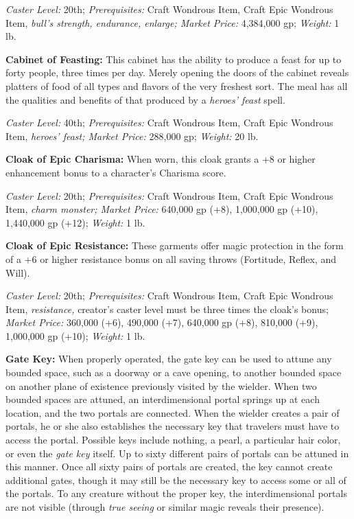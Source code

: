 \documentclass{article}
\begin{document}
\textit{Caster Level: }20th; \textit{Prerequisites: }Craft Wondrous Item, Craft 
Epic Wondrous Item, \textit{bull's strength, endurance, enlarge; Market Price: 
}4,384,000 gp; \textit{Weight: }1 lb. 

\textbf{Cabinet of Feasting: }This cabinet has the ability to produce a feast for 
up to forty people, three times per day. Merely opening the doors of the cabinet 
reveals platters of food of all types and flavors of the very freshest sort. The 
meal has all the qualities and benefits of that produced by a \textit{heroes' feast 
}spell. 

\textit{Caster Level: }40th; \textit{Prerequisites: }Craft Wondrous Item, Craft 
Epic Wondrous Item, \textit{heroes' feast; Market Price: }288,000 gp; \textit{Weight: 
}20 lb. 

\textbf{Cloak of Epic Charisma: }When worn, this cloak grants a +8 or higher enhancement 
bonus to a character's Charisma score. 

\textit{Caster Level: }20th; \textit{Prerequisites: }Craft Wondrous Item, Craft 
Epic Wondrous Item, \textit{charm monster; Market Price: }640,000 gp (+8), 1,000,000 
gp (+10), 1,440,000 gp (+12); \textit{Weight: }1 lb. 

\textbf{Cloak of Epic Resistance: }These garments offer magic protection in the 
form of a +6 or higher resistance bonus on all saving throws (Fortitude, Reflex, 
and Will). 

\textit{Caster Level: }20th; \textit{Prerequisites: }Craft Wondrous Item, Craft 
Epic Wondrous Item, \textit{resistance, }creator's caster level must be three times 
the cloak's bonus; \textit{Market Price: }360,000 (+6), 490,000 (+7), 640,000 gp 
(+8), 810,000 (+9), 1,000,000 gp (+10); \textit{Weight: }1 lb. 

\textbf{Gate Key: }When properly operated, the gate key can be used to attune any 
bounded space, such as a doorway or a cave opening, to another bounded space on 
another plane of existence previously visited by the wielder. When two bounded 
spaces are attuned, an interdimensional portal springs up at each location, and 
the two portals are connected. When the wielder creates a pair of portals, he or 
she also establishes the necessary key that travelers must have to access the portal. 
Possible keys include nothing, a pearl, a particular hair color, or even the \textit{gate 
key }itself. Up to sixty different pairs of portals can be attuned in this manner. 
Once all sixty pairs of portals are created, the key cannot create additional gates, 
though it may still be the necessary key to access some or all of the portals. 
To any creature without the proper key, the interdimensional portals are not visible 
(through \textit{true seeing }or similar magic reveals their presence). 
\end{document}
